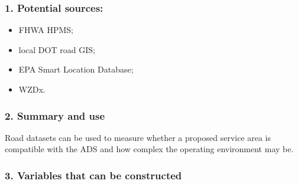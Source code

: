 \documentclass[10pt,a4paper]{article}
\providecommand{\tightlist}{\setlength{\itemsep}{0pt}\setlength{\parskip}{0pt}}
\begin{document}
\hypertarget{potential-sources-1}{%
\subsubsection{1. Potential sources:}\label{potential-sources-1}}

\begin{itemize}
\tightlist
\item
  FHWA HPMS;
\item
  local DOT road GIS;
\item
  EPA Smart Location Database;
\item
  WZDx.
\end{itemize}

\hypertarget{summary-and-use-1}{%
\subsubsection{2. Summary and use}\label{summary-and-use-1}}

Road datasets can be used to measure whether a proposed service area is compatible with the ADS and how complex the operating environment may be.

\hypertarget{variables-that-can-be-constructed-1}{%
\subsubsection{3. Variables that can be constructed}\label{variables-that-can-be-constructed-1}}
\end{document}
